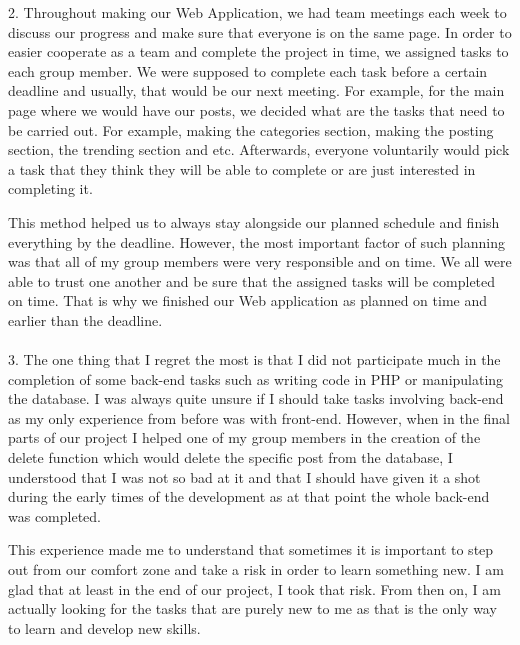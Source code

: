 \documentclass{article}
\begin{document}
2.	Throughout making our Web Application, we had team meetings each week to discuss our progress and make sure that everyone is on the same page. In order to easier cooperate as a team and complete the project in time, we assigned tasks to each group member. We were supposed to complete each task before a certain deadline and usually, that would be our next meeting. For example, for the main page where we would have our posts, we decided what are the tasks that need to be carried out. For example, making the categories section, making the posting section, the trending section and etc. Afterwards, everyone voluntarily would pick a task that they think they will be able to complete or are just interested in completing it. 

\setlength{\parindent}{20pt}This method helped us to always stay alongside our planned schedule and finish everything by the deadline. However, the most important factor of such planning was that all of my group members were very responsible and on time. We all were able to trust one another and be sure that the assigned tasks will be completed on time. That is why we finished our Web application as planned on time and earlier than the deadline. \\\\

3.	The one thing that I regret the most is that I did not participate much in the completion of some back-end tasks such as writing code in PHP or manipulating the database. I was always quite unsure if I should take tasks involving back-end as my only experience from before was with front-end. However, when in the final parts of our project I helped one of my group members in the creation of the delete function which would delete the specific post from the database, I understood that I was not so bad at it and that I should have given it a shot during the early times of the development as at that point the whole back-end was completed. 

\setlength{\parindent}{20pt} This experience made me to understand that sometimes it is important to step out from our comfort zone and take a risk in order to learn something new. I am glad that at least in the end of our project, I took that risk. From then on, I am actually looking for the tasks that are purely new to me as that is the only way to learn and develop new skills.
\end{document}
